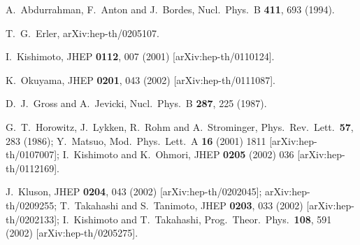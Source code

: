 \documentclass[a4paper,11pt]{article}
\begin{document}
\begin{thebibliography}{99}
 {\small A.~Abdurrahman, F.~Anton and J.~Bordes,
Nucl.\ Phys.\ B \textbf{411}, 693 (1994). %
}

{\small %
}

 {\small T.~G.~Erler,
arXiv:hep-th/0205107. %
}

{\small %
}

 {\small I.~Kishimoto,
JHEP \textbf{0112}, 007 (2001) [arXiv:hep-th/0110124].
}

{\small %
}

 {\small K.~Okuyama,
JHEP \textbf{0201}, 043 (2002) [arXiv:hep-th/0111087].
}

 {\small %
D.~J.~Gross and A.~Jevicki,
Nucl.\ Phys.\ B \textbf{287}, 225 (1987). %
}

{\small %
}

 {\small G.~T.~Horowitz, J.~Lykken, R.~Rohm and A.~Strominger,
Phys.\ Rev.\ Lett.\ \textbf{57}, 283 (1986);\newline
Y.~Matsuo,
Mod.\ Phys.\ Lett.\ A \textbf{16} (2001) 1811 [arXiv:hep-th/0107007];\newline
I.~Kishimoto and K.~Ohmori,
JHEP \textbf{0205} (2002) 036 [arXiv:hep-th/0112169]. }


 {\small J.~Kluson,
JHEP \textbf{0204}, 043 (2002) [arXiv:hep-th/0202045];
arXiv:hep-th/0209255;\newline
%
T.~Takahashi and S.~Tanimoto,
JHEP \textbf{0203}, 033 (2002) [arXiv:hep-th/0202133];\newline
%
I.~Kishimoto and T.~Takahashi,
Prog.\ Theor.\ Phys.\  {\bf 108}, 591 (2002)
[arXiv:hep-th/0205275].
}
\end{thebibliography}
\end{document}
